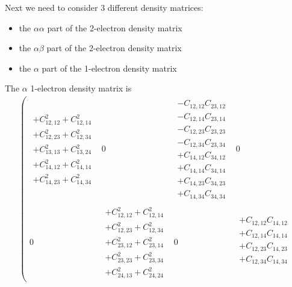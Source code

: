 \documentclass[pra,nofootinbib]{revtex4-1}
\newcommand{\C}[2]{C_{{#1},{#2}}}
\begin{document}
Next we need to consider 3 different density matrices: 
\begin{itemize}
\item the $\alpha\alpha$ part of the 2-electron density matrix
\item the $\alpha\beta$ part of the 2-electron density matrix
\item the $\alpha$ part of the 1-electron density matrix
\end{itemize}
The $\alpha$ 1-electron density matrix is
\begin{eqnarray}
   \left(\begin{array}{cccc}
     \begin{array}{c}
     + \C{12}{12}^2 + \C{12}{14}^2 \\
     + \C{12}{23}^2 + \C{12}{34}^2 \\
     + \C{13}{13}^2 + \C{13}{24}^2 \\
     + \C{14}{12}^2 + \C{14}{14}^2 \\
     + \C{14}{23}^2 + \C{14}{34}^2 
     \end{array} &
     0 &
     \begin{array}{c}
     - \C{12}{12}\C{23}{12} \\
     - \C{12}{14}\C{23}{14} \\
     - \C{12}{23}\C{23}{23} \\
     - \C{12}{34}\C{23}{34} \\
     + \C{14}{12}\C{34}{12} \\
     + \C{14}{14}\C{34}{14} \\
     + \C{14}{23}\C{34}{23} \\
     + \C{14}{34}\C{34}{34} 
     \end{array} &
     0 \\
     0 &
     \begin{array}{c}
     + \C{12}{12}^2 + \C{12}{14}^2 \\
     + \C{12}{23}^2 + \C{12}{34}^2 \\
     + \C{23}{12}^2 + \C{23}{14}^2 \\
     + \C{23}{23}^2 + \C{23}{34}^2 \\
     + \C{24}{13}^2 + \C{24}{24}^2
     \end{array} &
     0 &
     \begin{array}{c}
     + \C{12}{12}\C{14}{12} \\
     + \C{12}{14}\C{14}{14} \\
     + \C{12}{23}\C{14}{23} \\
     + \C{12}{34}\C{14}{34} \\

\end{array}
\end{array}
\end{eqnarray}
\end{document}
